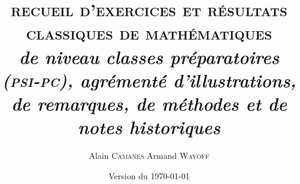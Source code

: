 \documentclass[
	a4paper, %
	fontsize=11pt, %
	twoside=true, %
	chapterentrydots=true, %
	numbers=noenddot, %
]{kaobook}
\begin{document}


\title[Recueil des Exercices et Résultats Classiques de Mathématiques]{
\fontsize{26pt}{28pt}\selectfont
\textcolor{mydarkblue}{\textrm{\textsc{
recueil d'exercices et résultats classiques de mathématiques
}}}
\\ \vspace{0.6cm}
\fontsize{16pt}{18pt}\selectfont
\textrm{\textsl{
de niveau classes préparatoires (\textsc{psi}-\textsc{pc}), agrémenté d’illustrations, de remarques, de méthodes et de notes historiques
}}
\\}

\author[Alain Camanes, Armand Wayoff]{Alain \textsc{Camanes} \coauteur Armand \textsc{Wayoff}}

\date{Version du \today}



\frontmatter %



\maketitle


\pageblanche
\end{document}
